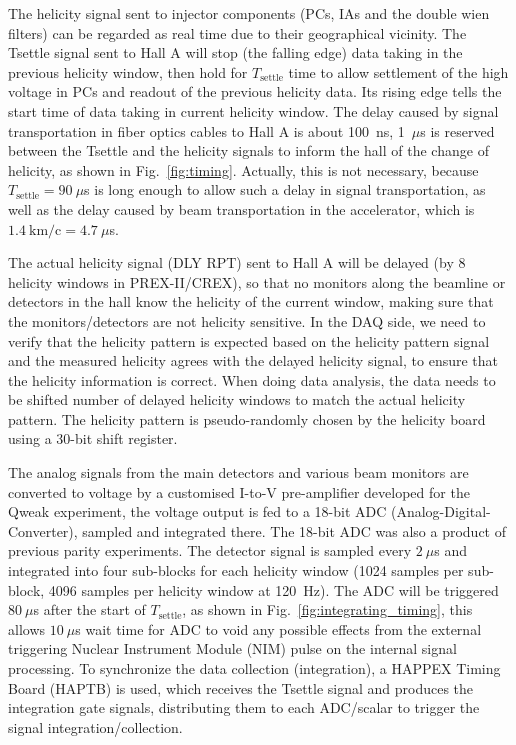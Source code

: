 The helicity signal sent to injector components (PCs, IAs and the double wien filters) 
can be regarded as real time due to their geographical vicinity. The Tsettle 
signal sent to Hall A will stop (the falling edge) data taking in the previous 
helicity window, then hold for $T_{\text{settle}}$ time to allow settlement of 
the high voltage in PCs and readout of the previous helicity data. 
Its rising edge tells the start time of data taking in current helicity window. 
The delay caused by signal transportation in fiber optics cables to Hall A 
is about 100~ns, 1~$\mu$s is reserved between the Tsettle and the helicity signals 
to inform the hall of the change of helicity, as shown in Fig.~\ref{fig:timing}.
Actually, this is not necessary, because $T_{\text{settle}} = 90\ \mu$s is long 
enough to allow such a delay in signal transportation, as well as the delay caused 
by beam transportation in the accelerator, which is $1.4 \ \text{km/c} = 4.7\ \mu$s.

The actual helicity signal (DLY RPT) sent to Hall A will be delayed (by 8 helicity windows
in PREX-II/CREX), so that no monitors along the beamline or detectors in the 
hall know the helicity of the current window, making sure that the monitors/detectors
are not helicity sensitive. In the DAQ side, we need to verify that
the helicity pattern is expected based on the helicity pattern signal and the 
measured helicity agrees with the delayed helicity signal, to ensure that the
helicity information is correct. When doing data analysis, the data needs 
to be shifted number of delayed helicity windows to match the actual helicity 
pattern. The helicity pattern is pseudo-randomly chosen by the helicity board 
using a 30-bit shift register.

The analog signals from the main detectors and various beam monitors are converted 
to voltage by a customised I-to-V pre-amplifier developed for the Qweak experiment, 
the voltage output is fed to a 18-bit ADC (Analog-Digital-Converter), sampled 
and integrated there. The 18-bit ADC was also a product of previous parity experiments. 
The detector signal is sampled every $2\ \mu$s and integrated into four sub-blocks 
for each helicity window (1024 samples per sub-block, 4096 samples per helicity window at 120~Hz).
The ADC will be triggered $80\ \mu$s after the start of $T_{\text{settle}}$, as shown
in Fig.~\ref{fig:integrating_timing}, this allows $10\ \mu$s wait time for 
ADC to void any possible effects from the external triggering Nuclear Instrument Module
(NIM) pulse on the internal signal processing. To synchronize the data collection (integration), 
a HAPPEX Timing Board (HAPTB) is used, which receives the Tsettle signal and
produces the integration gate signals, distributing them to each ADC/scalar to trigger
the signal integration/collection.

